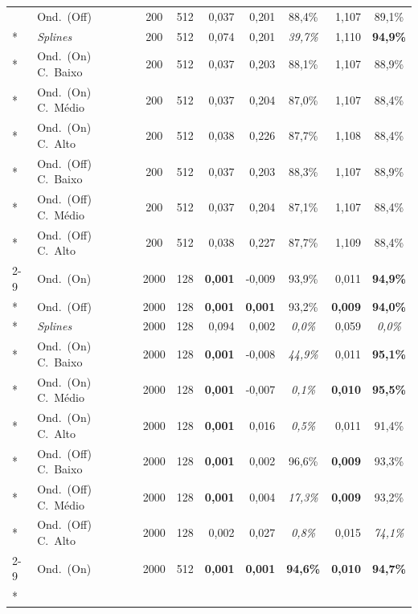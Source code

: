 {\begin{longtable}{@{}llccrrcrc@{}}
   & Ond.\ (Off) & 200 & 512 & 0{,}037 & 0{,}201 & 88{,}4\% & 1{,}107 & 89{,}1\% \\*
   & \emph{Splines} & 200 & 512 & 0{,074} & 0{,}201 & \textit{39{,7\%}} & 1{,}110 & \textbf{94{,9\%}} \\*
   & Ond.\ (On) C.\ Baixo & 200 & 512 & 0{,}037 & 0{,}203 & 88{,}1\% & 1{,}107 & 88{,}9\% \\*
   & Ond.\ (On) C.\ Médio & 200 & 512 & 0{,}037 & 0{,}204 & 87{,}0\% & 1{,}107 & 88{,}4\% \\*
   & Ond.\ (On) C.\ Alto & 200 & 512 & 0{,}038 & 0{,}226 & 87{,}7\% & 1{,}108 & 88{,}4\% \\*
   & Ond.\ (Off) C.\ Baixo & 200 & 512 & 0{,}037 & 0{,}203 & 88{,}3\% & 1{,}107 & 88{,}9\% \\*
   & Ond.\ (Off) C.\ Médio & 200 & 512 & 0{,}037 & 0{,}204 & 87{,}1\% & 1{,}107 & 88{,}4\% \\*
   & Ond.\ (Off) C.\ Alto & 200 & 512 & 0{,}038 & 0{,}227 & 87{,}7\% & 1{,}109 & 88{,}4\% \\
  \cmidrule{2-9}
  \multirow{9}{*}{\rotatebox[origin=c]{90}{Bumps}} & Ond.\ (On) & 2000 & 128 & \textbf{0{,001}} & -0{,}009 & 93{,}9\% & 0{,}011 & \textbf{94{,9\%}} \\*
   & Ond.\ (Off) & 2000 & 128 & \textbf{0{,001}} & \textbf{0{,001}} & 93{,}2\% & \textbf{0{,009}} & \textbf{94{,0\%}} \\*
   & \emph{Splines} & 2000 & 128 & 0{,094} & 0{,}002 & \textit{0{,0\%}} & 0{,}059 & \textit{0{,0\%}} \\*
   & Ond.\ (On) C.\ Baixo & 2000 & 128 & \textbf{0{,001}} & -0{,}008 & \textit{44{,9\%}} & 0{,}011 & \textbf{95{,1\%}} \\*
   & Ond.\ (On) C.\ Médio & 2000 & 128 & \textbf{0{,001}} & -0{,}007 & \textit{0{,1\%}} & \textbf{0{,}010} & \textbf{95{,5\%}} \\*
   & Ond.\ (On) C.\ Alto & 2000 & 128 & \textbf{0{,001}} & 0{,}016 & \textit{0{,5\%}} & 0{,}011 & 91{,}4\% \\*
   & Ond.\ (Off) C.\ Baixo & 2000 & 128 & \textbf{0{,001}} & 0{,002} & 96{,}6\% & \textbf{0{,009}} & 93{,}3\% \\*
   & Ond.\ (Off) C.\ Médio & 2000 & 128 & \textbf{0{,001}} & 0{,}004 & \textit{17{,3\%}} & \textbf{0{,009}} & 93{,}2\% \\*
   & Ond.\ (Off) C.\ Alto & 2000 & 128 & 0{,002} & 0{,}027 & \textit{0{,8\%}} & 0{,}015 & \textit{74{,1\%}} \\
  \cmidrule{2-9}
  \multirow{9}{*}{\rotatebox[origin=c]{90}{Bumps}} & Ond.\ (On) & 2000 & 512 & \textbf{0{,001}} & \textbf{0{,001}} & \textbf{94{,6\%}} & \textbf{0{,}010} & \textbf{94{,7\%}} \\*

\end{longtable}}
